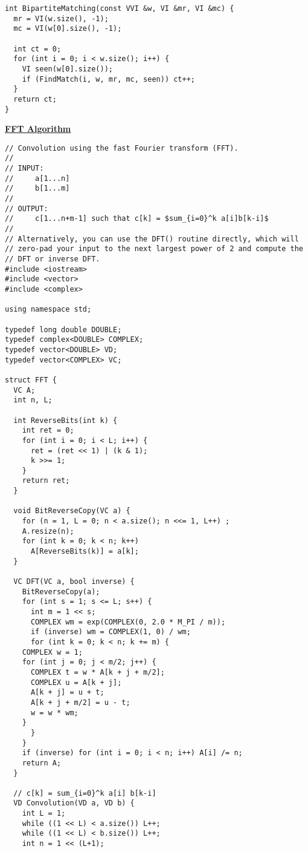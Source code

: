 \documentclass[10pt,a4paper]{report}
\begin{document}
\begin{landscape}
\begin{multicols}{2}
\begin{verbatim}
int BipartiteMatching(const VVI &w, VI &mr, VI &mc) {
  mr = VI(w.size(), -1);
  mc = VI(w[0].size(), -1);
  
  int ct = 0;
  for (int i = 0; i < w.size(); i++) {
    VI seen(w[0].size());
    if (FindMatch(i, w, mr, mc, seen)) ct++;
  }
  return ct;
}
\end{verbatim}


\begin{flushleft}
\textbf{\underline{FFT Algorithm}}
\end{flushleft}

\begin{verbatim}	
// Convolution using the fast Fourier transform (FFT).
//
// INPUT:
//     a[1...n]
//     b[1...m]
//
// OUTPUT:
//     c[1...n+m-1] such that c[k] = $sum_{i=0}^k a[i]b[k-i]$
//
// Alternatively, you can use the DFT() routine directly, which will
// zero-pad your input to the next largest power of 2 and compute the
// DFT or inverse DFT.
#include <iostream>
#include <vector>
#include <complex>

using namespace std;

typedef long double DOUBLE;
typedef complex<DOUBLE> COMPLEX;
typedef vector<DOUBLE> VD;
typedef vector<COMPLEX> VC;

struct FFT {
  VC A;
  int n, L;

  int ReverseBits(int k) {
    int ret = 0;
    for (int i = 0; i < L; i++) {
      ret = (ret << 1) | (k & 1);
      k >>= 1;
    }
    return ret;
  }

  void BitReverseCopy(VC a) {
    for (n = 1, L = 0; n < a.size(); n <<= 1, L++) ;
    A.resize(n);
    for (int k = 0; k < n; k++) 
      A[ReverseBits(k)] = a[k];
  }
  
  VC DFT(VC a, bool inverse) {
    BitReverseCopy(a);
    for (int s = 1; s <= L; s++) {
      int m = 1 << s;
      COMPLEX wm = exp(COMPLEX(0, 2.0 * M_PI / m));
      if (inverse) wm = COMPLEX(1, 0) / wm;
      for (int k = 0; k < n; k += m) {
	COMPLEX w = 1;
	for (int j = 0; j < m/2; j++) {
	  COMPLEX t = w * A[k + j + m/2];
	  COMPLEX u = A[k + j];
	  A[k + j] = u + t;
	  A[k + j + m/2] = u - t;
	  w = w * wm;
	}
      }
    }
    if (inverse) for (int i = 0; i < n; i++) A[i] /= n;
    return A;
  }

  // c[k] = sum_{i=0}^k a[i] b[k-i]
  VD Convolution(VD a, VD b) {
    int L = 1;
    while ((1 << L) < a.size()) L++;
    while ((1 << L) < b.size()) L++;
    int n = 1 << (L+1);


\end{verbatim}
\end{multicols}
\end{landscape}
\end{document}
